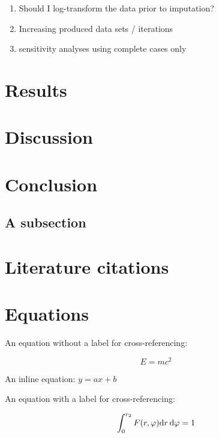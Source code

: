 \documentclass[webpdf,large,contemporary,namedate]{oup-authoring-template}
\providecommand{\tightlist}{%
  \setlength{\itemsep}{0pt}\setlength{\parskip}{0pt}}
\theoremstyle{thmstyleone}
\theoremstyle{thmstyletwo}
\theoremstyle{thmstylethree}
\begin{document}
\begin{enumerate}
\def\labelenumi{\arabic{enumi}.}
\tightlist
\item
  Should I log-transform the data prior to imputation?
\item
  Increasing produced data sets / iterations
\item
  sensitivity analyses using complete cases only
\end{enumerate}

\hypertarget{results}{%
\section{Results}\label{results}}

\hypertarget{discussion}{%
\section{Discussion}\label{discussion}}

\hypertarget{conclusion}{%
\section{Conclusion}\label{conclusion}}

\hypertarget{a-subsection}{%
\subsection{A subsection}\label{a-subsection}}

\hypertarget{literature-citations}{%
\section{Literature citations}\label{literature-citations}}

\hypertarget{equations}{%
\section{Equations}\label{equations}}

An equation without a label for cross-referencing:

\[
E=mc^2
\]

An inline equation: \(y=ax+b\)

An equation with a label for cross-referencing:

\begin{equation}\label{eq:eq1}
\int^{r_2}_0 F(r,\varphi){\rm d}r\,{\rm d}\varphi = 1
\end{equation}
\end{document}
